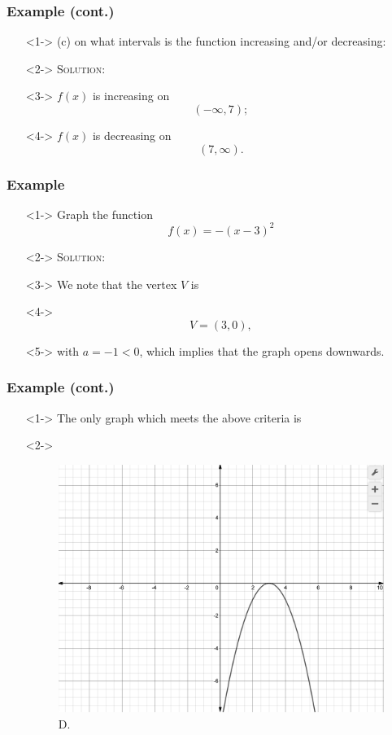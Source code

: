 \documentclass[handout]{beamer}
\begin{document}
\begin{frame}
	\frametitle{Example (cont.)}
	\begin{enumerate}
		\item[]<1-> (c) on what intervals is the function increasing and/or decreasing:
		\item[]<2-> \textsc{Solution:}
		\item[]<3-> $f(x)$ is increasing on \[ \left( -\infty, 7\right);  \]
		\item[]<4-> $f(x)$ is decreasing on
		\[
			(7, \infty).
		\]
	\end{enumerate}
\end{frame}

\begin{frame}
	\frametitle{Example}
	\begin{enumerate}
		\item[]<1-> Graph the function
		\[
			f(x)=-(x-3)^{2}
		\]
		\item[]<2-> \textsc{Solution:}
		\item[]<3-> We note that the vertex $V$ is
		\item[]<4-> \[ V=(3,0), \]
		\item[]<5-> with $a=-1<0$, which implies that the graph opens downwards.
	\end{enumerate}
\end{frame}

\begin{frame}
	\frametitle{Example (cont.)}
	\begin{enumerate}
		\item[]<1-> The only graph which meets the above criteria is
		\item[]<2->
		\begin{figure}
			\begin{center}
				\caption{D.}
				\includegraphics[scale=0.2]{3_3_8.png}
			\end{center}
		\end{figure}
	\end{enumerate}
\end{frame}
\end{document}
